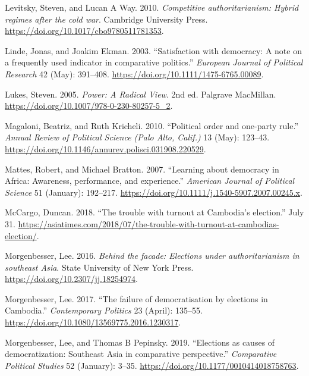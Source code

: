 \documentclass[Review,times,sageh,doublespace]{sagej}
\newlength{\cslhangindent}
\newenvironment{CSLReferences}[2] %
 {\begin{list}{}{%
  \setlength{\itemindent}{0pt}
  \setlength{\leftmargin}{0pt}
  \setlength{\parsep}{0pt}
  \ifodd #1
   \setlength{\leftmargin}{\cslhangindent}
   \setlength{\itemindent}{-1\cslhangindent}
  \fi
  \setlength{\itemsep}{#2\baselineskip}}}
 {\end{list}}
\begin{document}
\begin{CSLReferences}{1}{1}
Levitsky, Steven, and Lucan A Way. 2010. \emph{{Competitive
authoritarianism: Hybrid regimes after the cold war}}. Cambridge
University Press. \url{https://doi.org/10.1017/cbo9780511781353}.

Linde, Jonas, and Joakim Ekman. 2003. {``{Satisfaction with democracy: A
note on a frequently used indicator in comparative politics}.''}
\emph{European Journal of Political Research} 42 (May): 391--408.
\url{https://doi.org/10.1111/1475-6765.00089}.

Lukes, Steven. 2005. \emph{{Power: A Radical View}}. 2nd ed. Palgrave
MacMillan. \url{https://doi.org/10.1007/978-0-230-80257-5_2}.

Magaloni, Beatriz, and Ruth Kricheli. 2010. {``{Political order and
one-party rule}.''} \emph{Annual Review of Political Science (Palo Alto,
Calif.)} 13 (May): 123--43.
\url{https://doi.org/10.1146/annurev.polisci.031908.220529}.

Mattes, Robert, and Michael Bratton. 2007. {``{Learning about
{democracy} in {Africa}: Awareness, {performance}, and {experience}}.''}
\emph{American Journal of Political Science} 51 (January): 192--217.
\url{https://doi.org/10.1111/j.1540-5907.2007.00245.x}.

McCargo, Duncan. 2018. {``{The trouble with turnout at Cambodia's
election}.''} July 31.
\url{https://asiatimes.com/2018/07/the-trouble-with-turnout-at-cambodias-election/}.

Morgenbesser, Lee. 2016. \emph{{Behind the facade: Elections under
authoritarianism in southeast Asia}}. State University of New York
Press. \url{https://doi.org/10.2307/jj.18254974}.

Morgenbesser, Lee. 2017. {``{The failure of democratisation by elections
in Cambodia}.''} \emph{Contemporary Politics} 23 (April): 135--55.
\url{https://doi.org/10.1080/13569775.2016.1230317}.

Morgenbesser, Lee, and Thomas B Pepinsky. 2019. {``{Elections as causes
of democratization: Southeast Asia in comparative perspective}.''}
\emph{Comparative Political Studies} 52 (January): 3--35.
\url{https://doi.org/10.1177/0010414018758763}.


\end{CSLReferences}
\end{document}
